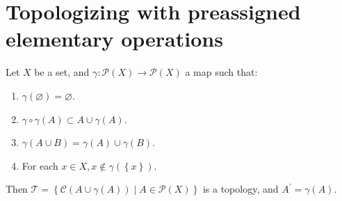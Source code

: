\section{Topologizing with preassigned elementary operations}

\begin{proposition}{5.2}
    Let \(X\) be a set, and \( \gamma: \mathscr{P}(X) \to \mathscr{P}(X) \) a map such that:
    \begin{enumerate}[label={(\arabic*)}]
        \item \( \gamma(\varnothing) = \varnothing \).
        \item \( \gamma \circ \gamma (A) \subset A \cup \gamma(A) \).
        \item \( \gamma(A \cup B) = \gamma(A) \cup \gamma(B) \).
        \item For each \( x \in X, x \notin \gamma(\left\{x\right\}) \).
    \end{enumerate}

    Then \( \mathscr{T} = \left\{ \mathscr{C}(A \cup \gamma(A)) \mid A \in \mathscr{P}(X) \right\} \) is a topology, and \( A^{\prime} = \gamma(A) \).
\end{proposition}

